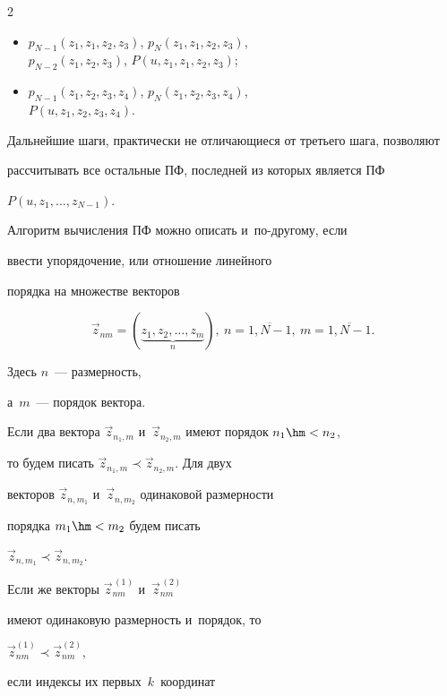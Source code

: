\begin{multicols}{2}
\begin{itemize}
\item $p_{N-1}(z_1,z_1,z_2,z_3)$,  $p_{N}(z_1,z_{1},z_2,z_3)$,\\


 $p_{N-2}(z_1,z_2,z_3)$, $P(u,z_1,z_1,z_2,z_3)$;





\item $p_{N-1}(z_1,z_2,z_3,z_4)$,  $p_{N}(z_1,z_{2},z_3,z_4)$,\\


 $P(u,z_1,z_2,z_3,z_4)$.


\end{itemize}





Дальнейшие шаги, практически не отличающиеся от третьего шага, позволяют


рассчитывать все остальные ПФ, последней из которых является ПФ 


$P(u,z_1,\ldots,z_{N-1})$.


Алгоритм вычисления ПФ можно описать и~по-дру\-го\-му, если


ввести упорядочение, или отношение линейного


порядка на множестве векторов 


$$


{\vec z}_{nm}=(\underbrace{z_1,z_2,\dots, z_m}_n),\ 


n = \overline{1,N-1},\ m = \overline{1,N-1}.


$$


 Здесь $n$~--- размерность, 


а~$m$~--- порядок вектора.


Если два вектора ${\vec z}_{n_1,m}$ и~${\vec z}_{n_2,m}$ имеют порядок $n_1\hm<n_2$,


то будем писать ${\vec z}_{n_1,m} \prec {\vec z}_{n_2,m}$. Для двух


векторов  ${\vec z}_{n,m_1}$ и~${\vec z}_{n,m_2}$ одинаковой размерности


порядка $m_1\hm<m_2$ будем писать


${\vec z}_{n,m_1} \prec {\vec z}_{n,m_2}$.


Если же векторы ${\vec z}^{\,(1)}_{nm}$ и~${\vec z}^{\,(2)}_{nm}$


имеют одинаковую размерность и~порядок, то


${\vec z}^{(1)}_{nm} \prec {\vec z}^{(2)}_{nm}$,


если индексы их первых~$k$~координат



\end{multicols}
